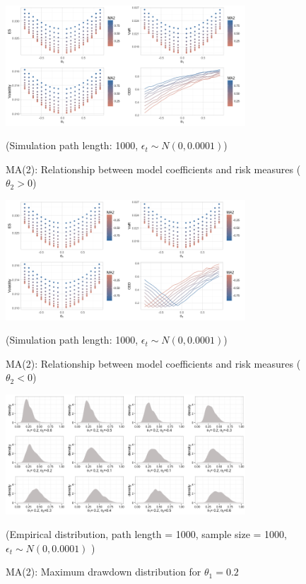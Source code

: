 \documentclass[11pt]{article}
\begin{document}
\begin{figure}[H]
\centering
\includegraphics[width = 0.8\textwidth]{../figures/simulation/MA2_risk_measures_pos_coef}
\caption{MA(2): Relationship between model coefficients and risk measures ($\theta_2>0$)}
(Simulation path length: 1000, $\epsilon_t \sim N(0, 0.0001)$)
\label{fig:MA2_risk_measures_pos_coef}
\end{figure}

\begin{figure}[H]
\centering
\includegraphics[width = 0.8\textwidth]{../figures/simulation/MA2_risk_measures_neg_coef}
\caption{MA(2): Relationship between model coefficients and risk measures ($\theta_2<0$)}
(Simulation path length: 1000, $\epsilon_t \sim N(0, 0.0001)$)
\label{fig:MA2_risk_measures_neg_coef}
\end{figure}

\begin{figure}[H]
\centering
\includegraphics[width = 0.8\textwidth]{../figures/simulation/MA2_maxDrawdown_dist_theta1_02}
\caption{MA(2): Maximum drawdown distribution for $\theta_1 = 0.2$}
(Empirical distribution, path length = 1000, sample size = 1000, $\epsilon_t \sim N(0, 0.0001)$ )
\label{fig:MA2_maxDrawdown_dist_theta1_02}
\end{figure}
\end{document}
